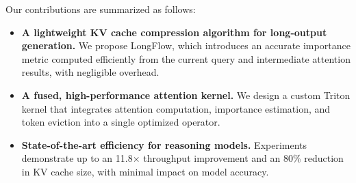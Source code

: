 Our contributions are summarized as follows:
\begin{itemize}[itemsep=3pt,topsep=0pt,parsep=0pt]
\item \textbf{A lightweight KV cache compression algorithm for long-output generation.} We propose LongFlow, which introduces an accurate importance metric computed efficiently from the current query and intermediate attention results, with negligible overhead.
\item \textbf{A fused, high-performance attention kernel.} We design a custom Triton kernel that integrates attention computation, importance estimation, and token eviction into a single optimized operator.
\item \textbf{State-of-the-art efficiency for reasoning models.} Experiments demonstrate up to an 11.8$\times$ throughput improvement and an 80\% reduction in KV cache size, with minimal impact on model accuracy.
\end{itemize}
